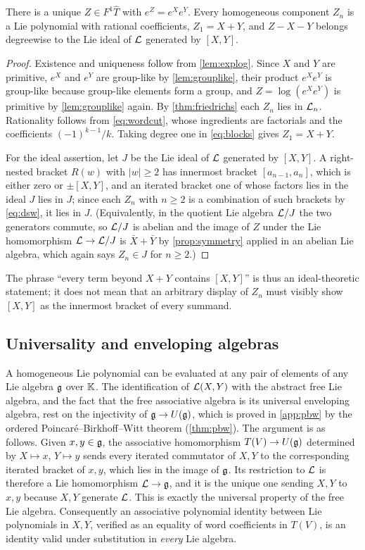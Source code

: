 \begin{theorem}\label{thm:formalbch}
There is a unique $Z\in F^1\widehat T$ with $e^Z=e^Xe^Y$. Every homogeneous
component $Z_n$ is a Lie polynomial with rational coefficients, $Z_1=X+Y$,
and $Z-X-Y$ belongs degreewise to the Lie ideal of $\mathcal{L}$ generated by
$[X,Y]$.
\end{theorem}
\begin{proof}
Existence and uniqueness follow from \cref{lem:explog}. Since $X$ and $Y$
are primitive, $e^X$ and $e^Y$ are group-like by \cref{lem:grouplike}, their
product $e^Xe^Y$ is group-like because group-like elements form a group, and
$Z=\log(e^Xe^Y)$ is primitive by \cref{lem:grouplike} again. By
\cref{thm:friedrichs} each $Z_n$ lies in $\mathcal{L}_n$. Rationality follows from
\eqref{eq:wordcut}, whose ingredients are factorials and the coefficients
$(-1)^{k-1}/k$. Taking degree one in \eqref{eq:blocks} gives $Z_1=X+Y$.

For the ideal assertion, let $J$ be the Lie ideal of $\mathcal{L}$ generated by
$[X,Y]$. A right-nested bracket $R(w)$ with $|w|\geq2$ has innermost
bracket $[a_{n-1},a_n]$, which is either zero or $\pm[X,Y]$, and an iterated
bracket one of whose factors lies in the ideal $J$ lies in $J$; since each
$Z_n$ with $n\geq2$ is a combination of such brackets by \eqref{eq:dsw}, it
lies in $J$. (Equivalently, in the quotient Lie algebra $\mathcal{L}/J$ the two
generators commute, so $\mathcal{L}/J$ is abelian and the image of $Z$ under the
Lie homomorphism $\mathcal{L}\to\mathcal{L}/J$ is $\bar X+\bar Y$ by \cref{prop:symmetry}
applied in an abelian Lie algebra, which again says $Z_n\in J$ for
$n\geq2$.)
\end{proof}
The phrase ``every term beyond $X+Y$ contains $[X,Y]$'' is thus an
ideal-theoretic statement; it does not mean that an arbitrary display of
$Z_n$ must visibly show $[X,Y]$ as the innermost bracket of every summand.

\subsection{Universality and enveloping algebras}\label{sec:universal}
A homogeneous Lie polynomial can be evaluated at any pair of elements of any
Lie algebra $\mathfrak{g}$ over $\mathbb{K}$. The identification of $\mathcal{L}(X,Y)$ with the
abstract free Lie algebra, and the fact that the free associative algebra is
its universal enveloping algebra, rest on the injectivity of $\mathfrak{g}\to U(\mathfrak{g})$,
which is proved in \cref{app:pbw} by the ordered Poincar\'e--Birkhoff--Witt
theorem (\cref{thm:pbw}). The argument is as follows. Given $x,y\in\mathfrak{g}$, the
associative homomorphism $T(V)\to U(\mathfrak{g})$ determined by $X\mapsto x$,
$Y\mapsto y$ sends every iterated commutator of $X,Y$ to the corresponding
iterated bracket of $x,y$, which lies in the image of $\mathfrak{g}$. Its restriction
to $\mathcal{L}$ is therefore a Lie homomorphism $\mathcal{L}\to\mathfrak{g}$, and it is the unique
one sending $X,Y$ to $x,y$ because $X,Y$ generate $\mathcal{L}$. This is exactly the
universal property of the free Lie algebra. Consequently an associative
polynomial identity between Lie polynomials in $X,Y$, verified as an
equality of word coefficients in $T(V)$, is an identity valid under
substitution in \emph{every} Lie algebra.

